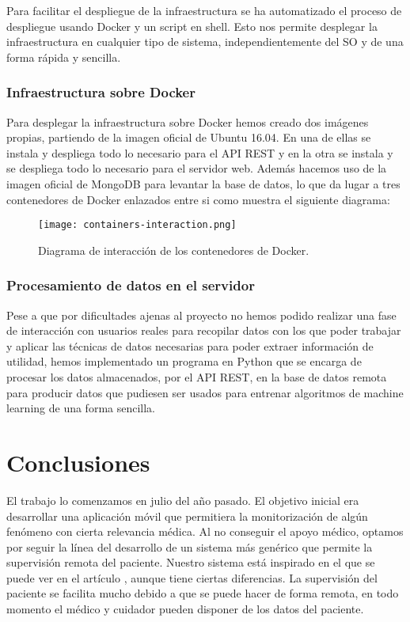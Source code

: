 \documentclass[11pt,spanish]{article}
\begin{document}
Para facilitar el despliegue de la infraestructura se ha automatizado el proceso de despliegue usando Docker y un script en shell. Esto nos permite desplegar la infraestructura en cualquier tipo de sistema, independientemente del SO y de una forma rápida y sencilla.

\subsubsection{Infraestructura sobre Docker}
Para desplegar la infraestructura sobre Docker hemos creado dos imágenes propias, partiendo de la imagen oficial de Ubuntu 16.04. En una de ellas se instala y despliega todo lo necesario para el API REST y en la otra se instala y se despliega todo lo necesario para el servidor web. Además hacemos uso de la imagen oficial de MongoDB para levantar la base de datos, lo que da lugar a tres contenedores de Docker enlazados entre si como muestra el siguiente diagrama:

\begin{figure}[H]
  \centering
  \texttt{[image: containers-interaction.png]}
  \caption{Diagrama de interacción de los contenedores de Docker.}
\end{figure}
\newpage

\subsubsection{Procesamiento de datos en el servidor}

Pese a que por dificultades ajenas al proyecto no hemos podido realizar una fase de interacción con usuarios reales para recopilar datos con los que poder trabajar y aplicar las técnicas de datos necesarias para poder extraer información de utilidad, hemos implementado un programa en Python que se encarga de procesar los datos almacenados, por el API REST, en la base de datos remota para producir datos que pudiesen ser usados para entrenar algoritmos de machine learning de una forma sencilla.
\newpage

\section{Conclusiones}
El trabajo lo comenzamos en julio del año pasado. El objetivo inicial era desarrollar una aplicación móvil que permitiera la monitorización de algún fenómeno con cierta relevancia médica. Al no conseguir el apoyo médico, optamos por seguir la línea del desarrollo de un sistema más genérico que permite la supervisión remota del paciente. Nuestro sistema está inspirado en el que se puede ver en el artículo \cite{resumen1}, aunque tiene ciertas diferencias. La supervisión del paciente se facilita mucho debido a que se puede hacer de forma remota, en todo momento el médico y cuidador pueden disponer de los datos del paciente.
\newline
\end{document}
